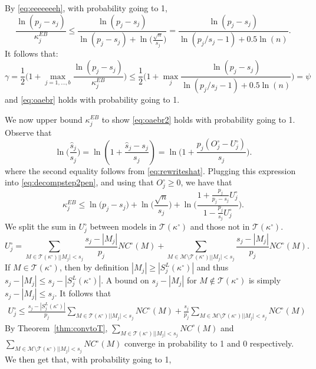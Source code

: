\documentclass[bj,authoryear]{imsart}
\theoremstyle{plain}
\newcommand{\M}{\mathcal{M}}
\newcommand{\T}{\mathcal{T}}
\begin{document}
By \eqref{eq:eeeeeeeh}, with probability going to 1,
$$ \frac{\ln(p_j-s_j)}{\kappa^{EB}_j}
    \leq \frac{\ln(p_j-s_j)}{\ln(p_j-s_j)+\ln\Big(\frac{\sqrt{n}}{s_j}\Big)} =  \frac{\ln(p_j-s_j)}{\ln(p_j/s_j-1)+0.5\ln(n)} .$$
It follows that:
\begin{equation*}
    \gamma=\frac12\Big(1+\max_{j=1, \ldots,b}\frac{\ln(p_j-s_j)}{\kappa^{EB}_j}\Big) \leq \frac12\Big(1+\max_j \frac{\ln(p_j-s_j)}{\ln(p_j/s_j-1)+0.5\ln(n)}\Big)=\psi
\end{equation*}
and \eqref{eq:oaebr} holds with probability going to 1.

We now upper bound $\kappa^{EB}_j$ to show \eqref{eq:oaebr2} holds with probability going to 1. Observe that 
$$
\ln\Big(\frac{\hat{s}_j}{s_j}\Big)=
 \ln \left( 1 + \frac{\hat{s}_j - s_j}{s_j}\right) =   
\ln\Big(1+\frac{p_j(O^{\circ}_j-U^{\circ}_j)}{s_j}\Big).
$$
where the second equality follows from \eqref{eq:rewriteshat}.
Plugging this expression into \eqref{eq:decompstep2pen}, and using that $O_j^{\circ} \geq 0$, we have that  %
\begin{equation}\label{eq:gggggggg}
    \kappa^{EB}_j \leq \ln\big(p_j-s_j\big)+\ln\Big(\frac{\sqrt{n}}{s_j}\Big)+\ln\bigg(\frac{1+\frac{p_j}{p_j-s_j}U^{\circ}_j}{1-\frac{p_j}{s_j}U^{\circ}_j}\bigg).
\end{equation}
We split the sum in $U^{\circ}_j$ between models in $\T(\kappa^{\circ})$ and those not in $\T(\kappa^{\circ})$. 
$$U_j^{\circ} = \sum_{M \in \T(\kappa^{\circ}) | |M_j| < s_j}\frac{s_j-|M_j|}{p_j}NC^{\circ}(M)+\sum_{M \in \M\setminus\T(\kappa^{\circ}) | |M_j| < s_j}\frac{s_j-|M_j|}{p_j}NC^{\circ}(M).
$$
If $M\in \T(\kappa^{\circ})$, then by definition $|M_j|\geq |S^{L}_j(\kappa^{\circ})|$ and thus $s_j-|M_j|\leq s_j-|S^{L}_j(\kappa^{\circ})|$. A bound on $s_j-|M_j|$ for $M\not\in \T(\kappa^{\circ})$ is simply $s_j-|M_j|\leq s_j$. It follows that
\begin{eqnarray*}
    U^{\circ}_j \leq \frac{s_j-|S^{L}_j(\kappa^{\circ})|}{p_j}\sum_{M \in \T(\kappa^{\circ}) | |M_j| < s_j}NC^{\circ}(M)+  \frac{s_j}{p_j}\sum_{M \in \M \setminus \T(\kappa^{\circ})| |M_j| < s_j}NC^{\circ}(M)
\end{eqnarray*}
By Theorem~\ref{thm:convtoT}, $\sum_{M \in  \T(\kappa^{\circ})| |M_j| < s_j}NC^{\circ}(M)$ and $\sum_{M \in \M \setminus \T(\kappa^{\circ})| |M_j| < s_j}NC^{\circ}(M)$ converge in probability to 1 and 0 respectively. We then get that, with probability going to 1,
\end{document}
